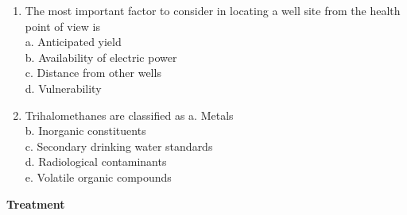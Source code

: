 \documentclass{article}
\begin{document}
\begin{enumerate}
\item The most important factor to consider in locating a well site from the health point of view is\\
a. Anticipated yield\\
b. Availability of electric power\\
c. Distance from other wells\\
d. Vulnerability\\

\item Trihalomethanes are classified as
a. Metals\\
b. Inorganic constituents\\
c. Secondary drinking water standards\\
d. Radiological contaminants\\
e. Volatile organic compounds\\



\end{enumerate}
\newpage
\textbf{Treatment}
\end{document}
